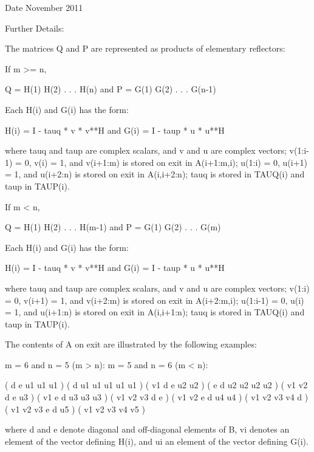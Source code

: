 \begin{DoxyDate}{Date}
November 2011 
\end{DoxyDate}
\begin{DoxyParagraph}{Further Details\+: }
\begin{DoxyVerb}  The matrices Q and P are represented as products of elementary
  reflectors:

  If m >= n,

     Q = H(1) H(2) . . . H(n)  and  P = G(1) G(2) . . . G(n-1)

  Each H(i) and G(i) has the form:

     H(i) = I - tauq * v * v**H  and G(i) = I - taup * u * u**H

  where tauq and taup are complex scalars, and v and u are complex
  vectors; v(1:i-1) = 0, v(i) = 1, and v(i+1:m) is stored on exit in
  A(i+1:m,i); u(1:i) = 0, u(i+1) = 1, and u(i+2:n) is stored on exit in
  A(i,i+2:n); tauq is stored in TAUQ(i) and taup in TAUP(i).

  If m < n,

     Q = H(1) H(2) . . . H(m-1)  and  P = G(1) G(2) . . . G(m)

  Each H(i) and G(i) has the form:

     H(i) = I - tauq * v * v**H  and G(i) = I - taup * u * u**H

  where tauq and taup are complex scalars, and v and u are complex
  vectors; v(1:i) = 0, v(i+1) = 1, and v(i+2:m) is stored on exit in
  A(i+2:m,i); u(1:i-1) = 0, u(i) = 1, and u(i+1:n) is stored on exit in
  A(i,i+1:n); tauq is stored in TAUQ(i) and taup in TAUP(i).

  The contents of A on exit are illustrated by the following examples:

  m = 6 and n = 5 (m > n):          m = 5 and n = 6 (m < n):

    (  d   e   u1  u1  u1 )           (  d   u1  u1  u1  u1  u1 )
    (  v1  d   e   u2  u2 )           (  e   d   u2  u2  u2  u2 )
    (  v1  v2  d   e   u3 )           (  v1  e   d   u3  u3  u3 )
    (  v1  v2  v3  d   e  )           (  v1  v2  e   d   u4  u4 )
    (  v1  v2  v3  v4  d  )           (  v1  v2  v3  e   d   u5 )
    (  v1  v2  v3  v4  v5 )

  where d and e denote diagonal and off-diagonal elements of B, vi
  denotes an element of the vector defining H(i), and ui an element of
  the vector defining G(i).\end{DoxyVerb}
 
\end{DoxyParagraph}
\hypertarget{group__complexGEcomputational_gaa2ad4e4b1c9cb56a23dd49a798aa9bc8}{}
